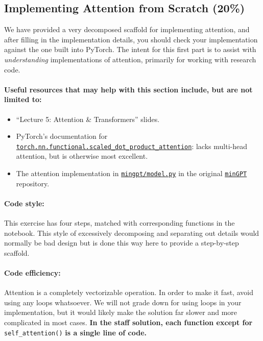 \documentclass{article}
\begin{document}
\subsection{Implementing Attention from Scratch (20\%)}

We have provided a very decomposed scaffold for implementing attention, and
after filling in the implementation details, you should check your
implementation against the one built into PyTorch. The intent for this first
part is to assist with \textit{understanding} implementations of attention,
primarily for working with research code. 

\paragraph{Useful resources that may help with this section include, but are not limited to:}

\begin{itemize}
    \item ``Lecture 5: Attention \& Transformers'' slides.
    \item PyTorch's documentation for
    \href{https://pytorch.org/docs/stable/generated/torch.nn.functional.scaled_dot_product_attention}{\texttt{torch.nn.functional.scaled\_dot\_product\_attention}}:
    lacks multi-head attention, but is otherwise most excellent.
    \item The attention implementation in
    \href{https://github.com/karpathy/minGPT/blob/master/mingpt/model.py#L29}{\texttt{mingpt/model.py}}
    in the original \href{https://github.com/karpathy/minGPT}{\texttt{minGPT}}
    repository.
\end{itemize}

\paragraph{Code style:} This exercise has four steps, matched with corresponding
functions in the notebook. This style of excessively decomposing and separating
out details would normally be bad design but is done this way here to provide a
step-by-step scaffold. 

\paragraph{Code efficiency:}
Attention is a completely vectorizable operation. In order to make it fast,
avoid using any loops whatsoever. We will not grade down for using loops in your
implementation, but it would likely make the solution far slower and more
complicated in most cases. \textbf{In the staff solution, each function except
for} \verb|self_attention()| \textbf{is a single line of code.}
\end{document}
